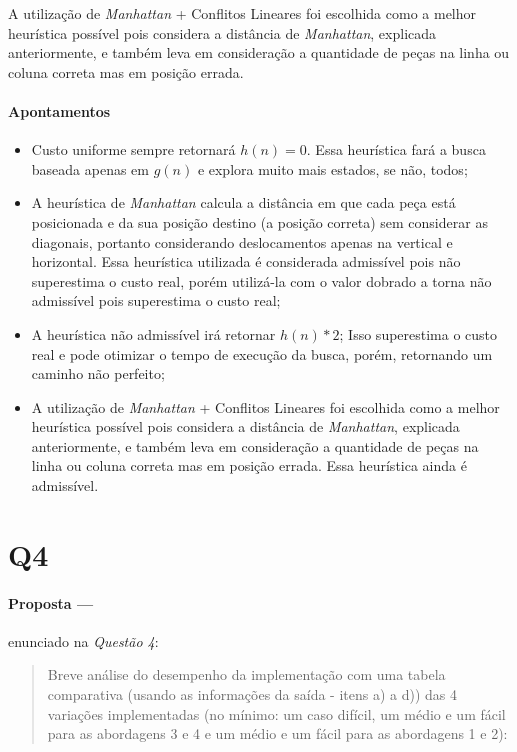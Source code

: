 \documentclass[12pt]{article}
\begin{document}
A utilização de \textit{Manhattan} + Conflitos Lineares foi escolhida como a melhor heurística possível pois considera a distância de \textit{Manhattan}, explicada anteriormente, e também leva em consideração a quantidade de peças na linha ou coluna correta mas em posição errada.

\paragraph{Apontamentos}
\begin{itemize}
  \item Custo uniforme sempre retornará $h(n) = 0$. Essa heurística fará a busca baseada apenas em $g(n)$ e explora
    muito mais estados, se não, todos;
  \item A heurística de \textit{Manhattan} calcula a distância em que cada peça está posicionada e da sua posição
    destino (a posição correta) sem considerar as diagonais, portanto considerando deslocamentos apenas na vertical e
    horizontal. Essa heurística utilizada é considerada admissível pois não superestima o custo real, porém utilizá-la
    com o valor dobrado a torna não admissível pois superestima o custo real\cite{sharma2016};
  \item A heurística não admissível irá retornar $h(n) * 2$; Isso superestima o custo real e pode otimizar o tempo de
    execução da busca, porém, retornando um caminho não perfeito;
  \item A utilização de \textit{Manhattan} + Conflitos Lineares foi escolhida como a melhor heurística possível pois considera a distância de \textit{Manhattan}, explicada anteriormente, e também leva em consideração a quantidade de peças na linha ou coluna correta mas em posição errada. Essa heurística ainda é admissível.
\end{itemize}

\section{Q4}\label{sec:q4}

\paragraph{Proposta ---} enunciado na \textit{Questão 4}:

\begin{quote}
Breve análise do desempenho da implementação com uma tabela comparativa (usando as informações da saída - itens a) a d)) das 4 variações implementadas (no mínimo: um caso difícil, um médio e um fácil para as abordagens 3 e 4 e um médio e um fácil para as abordagens 1 e 2):
\end{quote}
\end{document}

